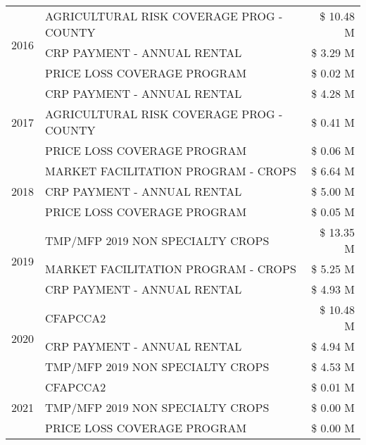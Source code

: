\begin{tabular}{llr}
\cline{1-3}
\multirow[t]{3}{*}{2016} & AGRICULTURAL RISK COVERAGE PROG - COUNTY & \$ 10.48 M \\
 & CRP PAYMENT - ANNUAL RENTAL & \$ 3.29 M \\
 & PRICE LOSS COVERAGE PROGRAM & \$ 0.02 M \\
\cline{1-3}
\multirow[t]{3}{*}{2017} & CRP PAYMENT - ANNUAL RENTAL & \$ 4.28 M \\
 & AGRICULTURAL RISK COVERAGE PROG - COUNTY & \$ 0.41 M \\
 & PRICE LOSS COVERAGE PROGRAM & \$ 0.06 M \\
\cline{1-3}
\multirow[t]{3}{*}{2018} & MARKET FACILITATION PROGRAM - CROPS & \$ 6.64 M \\
 & CRP PAYMENT - ANNUAL RENTAL & \$ 5.00 M \\
 & PRICE LOSS COVERAGE PROGRAM & \$ 0.05 M \\
\cline{1-3}
\multirow[t]{3}{*}{2019} & TMP/MFP 2019 NON SPECIALTY CROPS & \$ 13.35 M \\
 & MARKET FACILITATION PROGRAM - CROPS & \$ 5.25 M \\
 & CRP PAYMENT - ANNUAL RENTAL & \$ 4.93 M \\
\cline{1-3}
\multirow[t]{3}{*}{2020} & CFAPCCA2 & \$ 10.48 M \\
 & CRP PAYMENT - ANNUAL RENTAL & \$ 4.94 M \\
 & TMP/MFP 2019 NON SPECIALTY CROPS & \$ 4.53 M \\
\cline{1-3}
\multirow[t]{3}{*}{2021} & CFAPCCA2 & \$ 0.01 M \\
 & TMP/MFP 2019 NON SPECIALTY CROPS & \$ 0.00 M \\
 & PRICE LOSS COVERAGE PROGRAM & \$ 0.00 M \\
\cline{1-3}
\bottomrule
\end{tabular}
